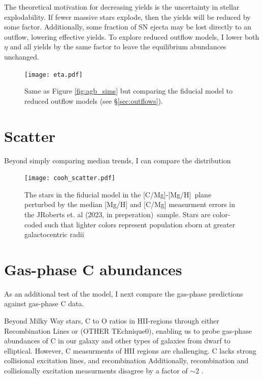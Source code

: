 \documentclass[12pt,oneside]{report}
\newcommand{\caah}{[C/Mg]-[Mg/H]}
\newcommand{\citetjack}{JRoberts et. al (2023, in preperation)}
\begin{document}
The theoretical motivation for decreasing yields is the uncertainty in stellar explodability.
If fewer massive stars explode, then the yields will be reduced by some factor. Additionally, some fraction of SN ejecta may be lost directly to an outflow, lowering effective yields. To explore reduced outflow models, I lower both $\eta$ and all yields by the same factor to leave the equilibrium abundances unchanged. 

\begin{figure}

\texttt{[image: eta.pdf]}

\caption[Reduced-outflow models]{Same as Figure \ref{fig:agb_sims} but comparing the fiducial model to reduced outflow models (see \S \ref{sec:outflows}).}
\end{figure}


\section{Scatter}

Beyond simply comparing median trends, I can compare the distribution 

\begin{figure}
    \centering
    \texttt{[image: cooh\_scatter.pdf]}
    \caption[Scatter agreement]{The stars in the fiducial model in the \caah~plane perturbed by the median [Mg/H] and [C/Mg] measurment errors in the \citetjack~sample. Stars are color-coded such that lighter colors represent population sborn at greater galactocentric radii
    }
\end{figure}



\section{Gas-phase C abundances}\label{sec:gas}

As an additional test of the model, I next compare the gas-phase predictions against gas-phase C data. 

Beyond Milky Way stars, C to O ratios in
HII-regions through either Recombination Lines or (OTHER TEchnique0), enabling
us to probe gas-phase abundances of C in our galaxy and other types of
galaxies from dwarf to elliptical. 
However, C measurments of HII regions are challenging. C lacks strong collisional excitation lines, and recombination
Additionally, recombination and collisionally excitation measurments disagree by a factor of $\sim 2$ \cite{GR07}.
\end{document}
